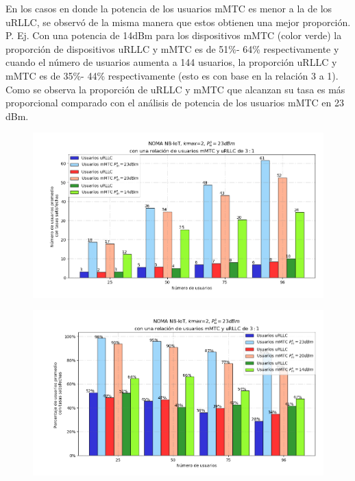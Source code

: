 En los casos en donde la potencia de los usuarios mMTC es menor a la de los uRLLC, se observó de la misma manera que estos obtienen una mejor proporción. P. Ej. Con una potencia de 14dBm para los dispositivos mMTC (color verde) la proporción de dispositivos uRLLC y mMTC es de 51\%- 64\% respectivamente y cuando el número de usuarios aumenta a 144 usuarios, la proporción uRLLC y mMTC es de 35\%- 44\% respectivamente (esto es con base en la relación 3 a 1). Como se observa la proporción de uRLLC y mMTC que alcanzan su tasa es más proporcional comparado con el análisis de potencia de los usuarios mMTC en 23 dBm. \newline



\begin{figure}[th]
    \centering
    \includegraphics[scale=.5]{Figures/ResultadosNOMA/Kmax2_DiferentesPM.png}
    \decoRule
    \caption[]{}
    \label{fig:Kmax2_DiferentesPM}
\end{figure}

\begin{figure}[th]
    \centering
    \includegraphics[scale=.5]{Figures/ResultadosNOMA/Kmax2_DiferentesPM_Porcentual.png}
    \decoRule
    \caption[]{}
    \label{fig:Kmax2_DiferentesPM_Porcentual}
\end{figure}


